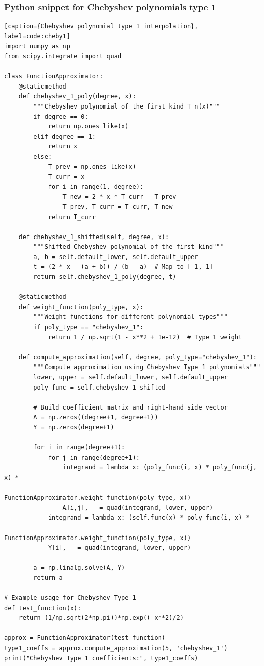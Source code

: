 \documentclass[10pt]{article}
\begin{document}
\subsubsection{Python snippet for Chebyshev polynomials type 1}
\begin{lstlisting}[style=custompython][caption={Chebyshev polynomial type 1 interpolation}, label=code:cheby1]
import numpy as np
from scipy.integrate import quad

class FunctionApproximator:
    @staticmethod
    def chebyshev_1_poly(degree, x):
        """Chebyshev polynomial of the first kind T_n(x)"""
        if degree == 0:
            return np.ones_like(x)
        elif degree == 1:
            return x
        else:
            T_prev = np.ones_like(x)
            T_curr = x
            for i in range(1, degree):
                T_new = 2 * x * T_curr - T_prev
                T_prev, T_curr = T_curr, T_new
            return T_curr

    def chebyshev_1_shifted(self, degree, x):
        """Shifted Chebyshev polynomial of the first kind"""
        a, b = self.default_lower, self.default_upper
        t = (2 * x - (a + b)) / (b - a)  # Map to [-1, 1]
        return self.chebyshev_1_poly(degree, t)

    @staticmethod
    def weight_function(poly_type, x):
        """Weight functions for different polynomial types"""
        if poly_type == "chebyshev_1":
            return 1 / np.sqrt(1 - x**2 + 1e-12)  # Type 1 weight

    def compute_approximation(self, degree, poly_type="chebyshev_1"):
        """Compute approximation using Chebyshev Type 1 polynomials"""
        lower, upper = self.default_lower, self.default_upper
        poly_func = self.chebyshev_1_shifted

        # Build coefficient matrix and right-hand side vector
        A = np.zeros((degree+1, degree+1))
        Y = np.zeros(degree+1)

        for i in range(degree+1):
            for j in range(degree+1):
                integrand = lambda x: (poly_func(i, x) * poly_func(j, x) * 
                                      FunctionApproximator.weight_function(poly_type, x))
                A[i,j], _ = quad(integrand, lower, upper)
            integrand = lambda x: (self.func(x) * poly_func(i, x) *
                                  FunctionApproximator.weight_function(poly_type, x))
            Y[i], _ = quad(integrand, lower, upper)

        a = np.linalg.solve(A, Y)
        return a

# Example usage for Chebyshev Type 1
def test_function(x):
    return (1/np.sqrt(2*np.pi))*np.exp((-x**2)/2)

approx = FunctionApproximator(test_function)
type1_coeffs = approx.compute_approximation(5, 'chebyshev_1')
print("Chebyshev Type 1 coefficients:", type1_coeffs)
\end{lstlisting}
\end{document}
